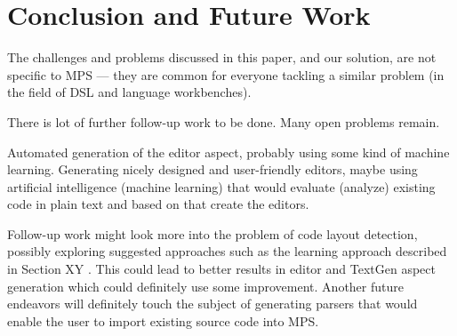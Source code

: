 \section{Conclusion and Future Work}

 The challenges and problems discussed in this paper, and our solution, are not specific to MPS --- they are common for everyone tackling a similar problem (in the field of DSL and language workbenches).


There is lot of further follow-up work to be done. Many open problems remain.

Automated generation of the editor aspect, probably using some kind of machine learning.
Generating nicely designed and user-friendly editors, maybe using artificial intelligence (machine learning) that would evaluate (analyze) existing code in plain text and based on that create the editors.

Follow-up work might look more into the problem of code layout detection, possibly exploring suggested approaches such as the learning approach described in Section XY .
This could lead to better results in editor and TextGen aspect generation which could definitely use some improvement.
Another future endeavors will definitely touch the subject of generating parsers that would enable the user to import existing source code into MPS.
